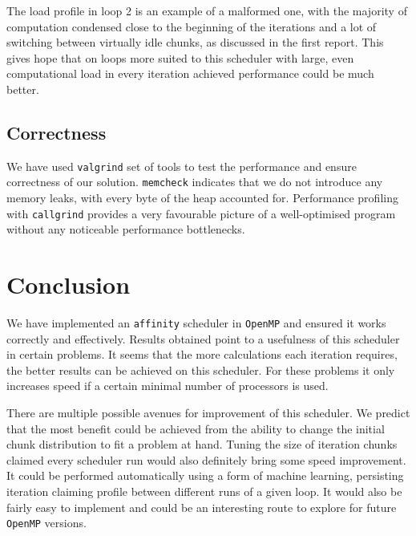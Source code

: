 \documentclass[11pt,a4paper]{article}
\begin{document}
The load profile in loop 2 is an example of a malformed one, with the majority of computation condensed close to the beginning of the iterations and a lot of switching between virtually idle chunks, as discussed in the first report.
This gives hope that on loops more suited to this scheduler with large, even computational load in every iteration achieved performance could be much better.

\subsection{Correctness}
We have used \texttt{valgrind} set of tools to test the performance and ensure correctness of our solution.
\texttt{memcheck} indicates that we do not introduce any memory leaks, with every byte of the heap accounted for.
Performance profiling with \texttt{callgrind} provides a very favourable picture of a well-optimised program without any noticeable performance bottlenecks.

\section{Conclusion}
We have implemented an \texttt{affinity} scheduler in \texttt{OpenMP} and ensured it works correctly and effectively.
Results obtained point to a usefulness of this scheduler in certain problems.
It seems that the more calculations each iteration requires, the better results can be achieved on this scheduler.
For these problems it only increases speed if a certain minimal number of processors is used.

There are multiple possible avenues for improvement of this scheduler. 
We predict that the most benefit could be achieved from the ability to change the initial chunk distribution to fit a problem at hand.
Tuning the size of iteration chunks claimed every scheduler run would also definitely bring some speed improvement.
It could be performed automatically using a form of machine learning, persisting iteration claiming profile between different runs of a given loop.
It would also be fairly easy to implement and could be an interesting route to explore for future \texttt{OpenMP} versions.
\end{document}
